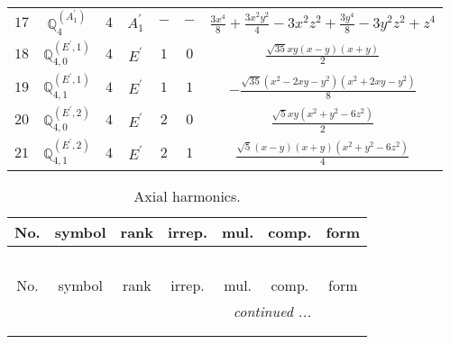 \documentclass[fleqn,10pt,landscape]{article}
\begin{document}
\begin{itemize}
\begin{center}
\begin{longtable}{ccccccc}
$ 17 $ & $ \mathbb{Q}_{4}^{(A_{1}^{\prime})} $ & $ 4 $ & $ A_{1}^{\prime} $ & $ - $ & $ - $ & $ \frac{3 x^{4}}{8} + \frac{3 x^{2} y^{2}}{4} - 3 x^{2} z^{2} + \frac{3 y^{4}}{8} - 3 y^{2} z^{2} + z^{4} $ \\
$ 18 $ & $ \mathbb{Q}_{4,0}^{(E^{\prime},1)} $ & $ 4 $ & $ E^{\prime} $ & $ 1 $ & $ 0 $ & $ \frac{\sqrt{35} x y \left(x - y\right) \left(x + y\right)}{2} $ \\
$ 19 $ & $ \mathbb{Q}_{4,1}^{(E^{\prime},1)} $ & $ 4 $ & $ E^{\prime} $ & $ 1 $ & $ 1 $ & $ - \frac{\sqrt{35} \left(x^{2} - 2 x y - y^{2}\right) \left(x^{2} + 2 x y - y^{2}\right)}{8} $ \\
$ 20 $ & $ \mathbb{Q}_{4,0}^{(E^{\prime},2)} $ & $ 4 $ & $ E^{\prime} $ & $ 2 $ & $ 0 $ & $ \frac{\sqrt{5} x y \left(x^{2} + y^{2} - 6 z^{2}\right)}{2} $ \\
$ 21 $ & $ \mathbb{Q}_{4,1}^{(E^{\prime},2)} $ & $ 4 $ & $ E^{\prime} $ & $ 2 $ & $ 1 $ & $ \frac{\sqrt{5} \left(x - y\right) \left(x + y\right) \left(x^{2} + y^{2} - 6 z^{2}\right)}{4} $ \\
\end{longtable}
\end{center}
\begin{center}
\renewcommand{\arraystretch}{1.3}
\begin{longtable}{ccccccc}
\caption{Axial harmonics.}
 \\
 \hline \hline
No. & symbol & rank & irrep. & mul. & comp. & form \\ \hline \endfirsthead

\multicolumn{6}{l}{\tablename\ \thetable{}} \\
 \hline \hline
No. & symbol & rank & irrep. & mul. & comp. & form \\ \hline \endhead

 \hline \hline
\multicolumn{6}{r}{\footnotesize\it continued ...} \\ \endfoot

 \hline \hline
\multicolumn{6}{r}{} \\ \endlastfoot


\end{longtable}
\end{center}
\end{itemize}
\end{document}
